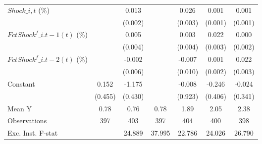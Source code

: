 {\begin{tabular}{l*{6}{c}}
\addlinespace
$ Shock\_{i,t}$ (\%) &                     &       0.013\sym{***}&                     &       0.026\sym{***}&       0.001\sym{**} &       0.001         \\
                    &                     &     (0.002)         &                     &     (0.003)         &     (0.001)         &     (0.001)         \\
\addlinespace
$ FctShock^f\_{i.t-1}(t)$ (\%)&                     &       0.005         &                     &       0.003         &       0.022\sym{***}&       0.000         \\
                    &                     &     (0.004)         &                     &     (0.004)         &     (0.003)         &     (0.002)         \\
\addlinespace
$ FctShock^f\_{i.t-2}(t)$ (\%)&                     &      -0.002         &                     &      -0.007         &       0.001         &       0.022\sym{***}\\
                    &                     &     (0.006)         &                     &     (0.010)         &     (0.002)         &     (0.003)         \\
\addlinespace
Constant            &       0.152         &      -1.175\sym{**} &                     &      -0.008         &      -0.246         &      -0.024         \\
                    &     (0.455)         &     (0.430)         &                     &     (0.923)         &     (0.406)         &     (0.341)         \\
\midrule
Mean Y              &        0.78         &        0.76         &        0.78         &        1.89         &        2.05         &        2.38         \\
Observations        &         397         &         403         &         397         &         404         &         400         &         398         \\
Exc. Inst. F-stat   &                     &      24.889         &      37.995         &      22.786         &      24.026         &      26.790         \\
\bottomrule
\end{tabular}
}
